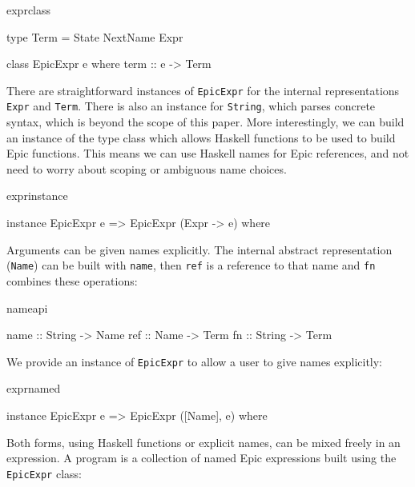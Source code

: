 \begin{SaveVerbatim}{exprclass}

type Term = State NextName Expr

class EpicExpr e where
    term :: e -> Term

\end{SaveVerbatim}

\noindent
There are straightforward instances of \texttt{EpicExpr} for the
internal representations \texttt{Expr} and \texttt{Term}. There is also
an instance for \texttt{String}, which parses concrete syntax, which
is beyond the scope of this paper. More interestingly, we can build an
instance of the type class which allows Haskell functions to be used
to build Epic functions.  This means we can use Haskell names for Epic
references, and not need to worry about scoping or ambiguous name
choices. 

\begin{SaveVerbatim}{exprinstance}

instance EpicExpr e => EpicExpr (Expr -> e) where

\end{SaveVerbatim}

\noindent
Arguments can be given names explicitly. The internal abstract
representation (\texttt{Name}) can be built with \texttt{name}, then
\texttt{ref} is a reference to that name and \texttt{fn} combines these
operations:

\begin{SaveVerbatim}{nameapi}

name :: String -> Name
ref  :: Name   -> Term
fn   :: String -> Term

\end{SaveVerbatim}


\noindent
We provide an instance of \texttt{EpicExpr} to allow a user to give
names explicitly:

\begin{SaveVerbatim}{exprnamed}

instance EpicExpr e => EpicExpr ([Name], e) where

\end{SaveVerbatim}

\noindent
Both forms, using Haskell functions or explicit names, can be mixed
freely in an expression. A program is a collection of named Epic
expressions built using the \texttt{EpicExpr} class:

